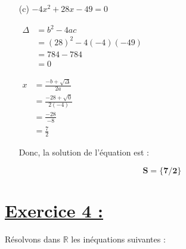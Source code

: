 \documentclass[12pt,a4paper]{article}
\begin{document}
\begin{enumerate}
    \item[(c)] \( -4x^2 + 28x - 49 = 0 \) 
    
\(
\begin{aligned}
\Delta &= b^2 - 4ac \\
       &= (28)^2 - 4(-4)(-49) \\
       &= 784 - 784 \\
       &= 0
\end{aligned}
\)

\(
\begin{aligned}
x &= \frac{-b + \sqrt{\Delta}}{2a} \\
  &= \frac{-28 + \sqrt{0}}{2(-4)} \\
  &= \frac{-28}{-8} \\
  &= \frac{7}{2}
\end{aligned}
\)

Donc, la solution de l'équation est :

\begin{tcolorbox}[colback=yellow!20, colframe=black, sharp corners]
    \[
    \mathbf{S = \{ 7/2 \}}
    \]
\end{tcolorbox}

\end{enumerate}

\section*{\underline{Exercice 4 :}}

Résolvons dans \( \mathbb{R} \) les inéquations suivantes :
\end{document}
